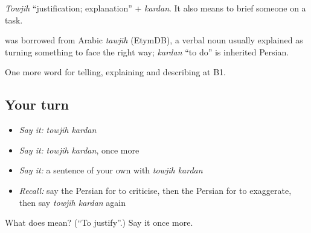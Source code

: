 \emph{Towjih} \textquotedblleft{}justification; explanation\textquotedblright{} + \emph{kardan}. It also means to brief someone on a task.

\begin{cousinweb}
\textbf{} was borrowed from Arabic \emph{tawjīh} (EtymDB), a verbal noun usually explained as turning something to face the right way; \emph{kardan} \textquotedblleft{}to do\textquotedblright{} is inherited Persian.
\end{cousinweb}

\begin{grammarlens}[title={What you've built}]
One more word for telling, explaining and describing at B1.
\end{grammarlens}

\subsection*{Your turn}
\begin{itemize}
\raggedright
  \item \emph{Say it:} \emph{towjih kardan}
  \item \emph{Say it:} \emph{towjih kardan}, once more
  \item \emph{Say it:} a sentence of your own with \emph{towjih kardan}
  \item \emph{Recall:} say the Persian for to criticise, then the Persian for to exaggerate, then say \emph{towjih kardan} again
\end{itemize}

\begin{tcolorbox}[breakable,colback=teal!4,colframe=teal!35!black,title={Before you move on}]
What does   mean? (\textquotedblleft{}To justify\textquotedblright{}.) Say it once more.
\end{tcolorbox}
